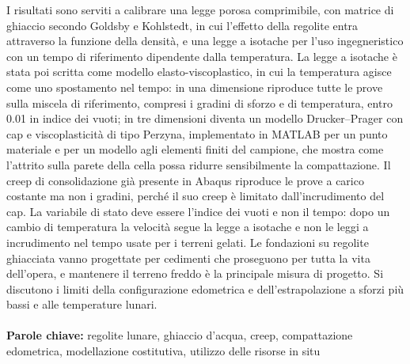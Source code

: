 \documentclass{Configuration_Files/PoliMi3i_thesis}
\begin{document}
I risultati sono serviti a calibrare una legge porosa comprimibile, con matrice di ghiaccio secondo Goldsby e Kohlstedt, in cui l'effetto della regolite entra attraverso la funzione della densità, e una legge a isotache per l'uso ingegneristico con un tempo di riferimento dipendente dalla temperatura. La legge a isotache è stata poi scritta come modello elasto-viscoplastico, in cui la temperatura agisce come uno spostamento nel tempo: in una dimensione riproduce tutte le prove sulla miscela di riferimento, compresi i gradini di sforzo e di temperatura, entro 0.01 in indice dei vuoti; in tre dimensioni diventa un modello Drucker--Prager con cap e viscoplasticità di tipo Perzyna, implementato in MATLAB per un punto materiale e per un modello agli elementi finiti del campione, che mostra come l'attrito sulla parete della cella possa ridurre sensibilmente la compattazione. Il creep di consolidazione già presente in Abaqus riproduce le prove a carico costante ma non i gradini, perché il suo creep è limitato dall'incrudimento del cap. La variabile di stato deve essere l'indice dei vuoti e non il tempo: dopo un cambio di temperatura la velocità segue la legge a isotache e non le leggi a incrudimento nel tempo usate per i terreni gelati. Le fondazioni su regolite ghiacciata vanno progettate per cedimenti che proseguono per tutta la vita dell'opera, e mantenere il terreno freddo è la principale misura di progetto. Si discutono i limiti della configurazione edometrica e dell'estrapolazione a sforzi più bassi e alle temperature lunari.
\\
\\
\textbf{Parole chiave:} regolite lunare, ghiaccio d'acqua, creep, compattazione edometrica, modellazione costitutiva, utilizzo delle risorse in situ %


\thispagestyle{empty}
\tableofcontents %
\thispagestyle{empty}
\cleardoublepage

%
%
%    
%
\end{document}
